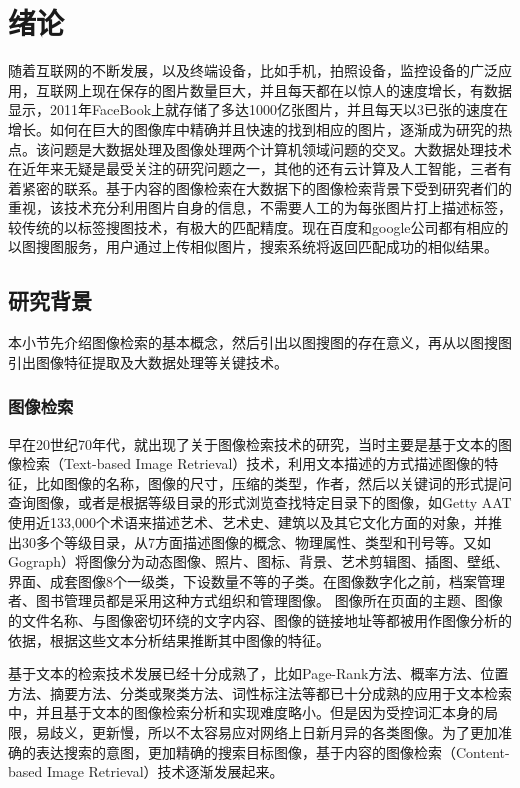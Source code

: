 ﻿\chapter{绪论}

随着互联网的不断发展，以及终端设备，比如手机，拍照设备，监控设备的广泛应用，互联网上现在保存的图片数量巨大，并且每天都在以惊人的速度增长，有数据显示，2011年FaceBook上就存储了多达1000亿张图片，并且每天以3已张的速度在增长。如何在巨大的图像库中精确并且快速的找到相应的图片，逐渐成为研究的热点。该问题是大数据处理及图像处理两个计算机领域问题的交叉。大数据处理技术在近年来无疑是最受关注的研究问题之一，其他的还有云计算及人工智能，三者有着紧密的联系。基于内容的图像检索在大数据下的图像检索背景下受到研究者们的重视，该技术充分利用图片自身的信息，不需要人工的为每张图片打上描述标签，较传统的以标签搜图技术，有极大的匹配精度。现在百度和google公司都有相应的以图搜图服务，用户通过上传相似图片，搜索系统将返回匹配成功的相似结果。

\section{研究背景}
本小节先介绍图像检索的基本概念，然后引出以图搜图的存在意义，再从以图搜图引出图像特征提取及大数据处理等关键技术。

\subsection{图像检索}
早在20世纪70年代，就出现了关于图像检索技术的研究，当时主要是基于文本的图像检索（Text-based Image Retrieval）技术，利用文本描述的方式描述图像的特征，比如图像的名称，图像的尺寸，压缩的类型，作者，然后以关键词的形式提问查询图像，或者是根据等级目录的形式浏览查找特定目录下的图像，如Getty AAT使用近133,000个术语来描述艺术、艺术史、建筑以及其它文化方面的对象，并推出30多个等级目录，从7方面描述图像的概念、物理属性、类型和刊号等。又如Gograph）将图像分为动态图像、照片、图标、背景、艺术剪辑图、插图、壁纸、界面、成套图像8个一级类，下设数量不等的子类。在图像数字化之前，档案管理者、图书管理员都是采用这种方式组织和管理图像。 图像所在页面的主题、图像的文件名称、与图像密切环绕的文字内容、图像的链接地址等都被用作图像分析的依据，根据这些文本分析结果推断其中图像的特征。

基于文本的检索技术发展已经十分成熟了，比如Page-Rank方法、概率方法、位置方法、摘要方法、分类或聚类方法、词性标注法等都已十分成熟的应用于文本检索中，并且基于文本的图像检索分析和实现难度略小。但是因为受控词汇本身的局限，易歧义，更新慢，所以不太容易应对网络上日新月异的各类图像。为了更加准确的表达搜索的意图，更加精确的搜索目标图像，基于内容的图像检索（Content-based Image Retrieval）技术逐渐发展起来。

